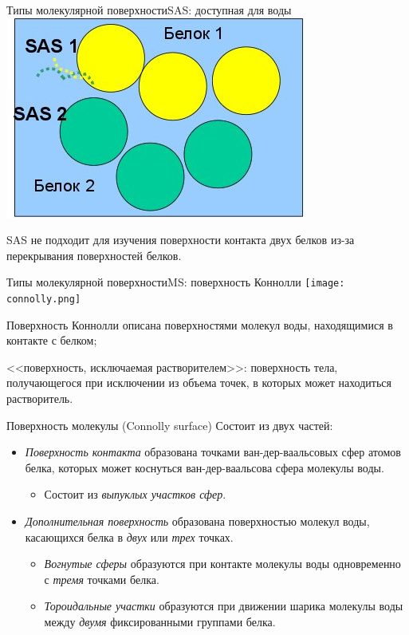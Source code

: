 \documentclass{beamer}
\begin{document}
    \begin{frame}{Типы молекулярной поверхности}{SAS: доступная для воды}
        \includegraphics[width=0.5\linewidth]{sas-contact.jpg}

        SAS не подходит для изучения поверхности контакта двух белков
        из-за перекрывания поверхностей белков.
    \end{frame}

    \begin{frame}{Типы молекулярной поверхности}{MS: поверхность Коннолли}
        \texttt{[image: connolly.png]}

        Поверхность Коннолли описана поверхностями молекул воды,
        находящимися в контакте с белком;

        <<поверхность, исключаемая растворителем>>:
        поверхность тела, получающегося при исключении из объема точек,
        в которых может находиться растворитель.

    \end{frame}

    \begin{frame}{Поверхность молекулы (Connolly surface)}
        Состоит из двух частей:
        \begin{itemize}
        \item \emph{Поверхность контакта} образована точками ван-дер-ваальсовых
            сфер атомов белка, которых может коснуться ван-дер-ваальсова сфера
            молекулы воды.
            \begin{itemize}
            \item Состоит из \emph{выпуклых участков сфер}.
            \end{itemize}
        \item \emph{Дополнительная поверхность} образована поверхностью
            молекул воды, касающихся белка в \emph{двух} или \emph{трех} точках.
            \begin{itemize}
            \item \emph{Вогнутые сферы} образуются при контакте
                молекулы воды одновременно с \emph{тремя} точками белка.
            \item \emph{Тороидальные участки}
                образуются при движении шарика молекулы воды
                между \emph{двумя} фиксированными группами белка.
            \end{itemize}
        \end{itemize}
    \end{frame}
\end{document}
